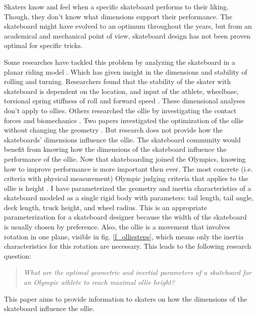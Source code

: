 Skaters know and feel when a specific skateboard performs to their liking. Though, they don’t know what dimensions support their performance. The skateboard might have evolved to an optimum throughout the years, but from an academical and mechanical point of view, skateboard design has not been proven optimal for specific tricks.

Some researches have tackled this problem by analyzing the skateboard in a planar riding model \cite{hubbard_lateral_1979,hubbard_human_1980,kremnev_nonlinear_2010,ispolov_skateboard_1996,rosatello_skateboard_2015,varszegi_stability_2017,varszegi_stabilizing_2016,varszegi_downhill_2016,varszegi_balancing_2014,kuleshov_mathematical_2007,kuleshov_various_2010}. Which has given insight in the dimensions and stability of rolling and turning. Researchers found that the stability of the skater with skateboard is dependent on the location, and input of the athlete, wheelbase, torsional spring stiffness of roll and forward speed \cite{varszegi_stability_2017,kremnev_nonlinear_2010,hubbard_lateral_1979}. These dimensional analyses don't apply to ollies. Others researched the ollie by investigating the contact forces \cite{anderson_ollie_2020,shield_contact-implicit_2022} and biomechanics \cite{frederick_biomechanics_2006,vorlicek_analysis_2015,wood_3d_2020,nakashima_simulation_2021,nevitt_ground_2006,candotti_lower_2012,dias_using_2016,anderson_ollie_2020,bridgman_human_1992,ou_postural_2021}. Two papers investigated the optimization of the ollie without changing the geometry \cite{anderson_ollie_2020,shield_contact-implicit_2022}. But research does not provide how the skateboards' dimensions influence the ollie. The skateboard community would benefit from knowing how the dimensions of the skateboard influence the performance of the ollie. 
Now that skateboarding joined the Olympics, knowing how to improve performance is more important then ever. The most concrete (i.e. criteria with physical measurement) Olympic judging criteria that applies to the ollie is height \cite{world_skate_skateboarding_2021}. I have parameterized the geometry and inertia characteristics of a skateboard modeled as a single rigid body with parameters: tail length, tail angle, deck length, truck height, and wheel radius. This is an appropriate parameterization for a skateboard designer because the width of the skateboard is usually chosen by preference. Also, the ollie is a movement that involves rotation in one plane, visible in fig. \ref{f_olliesteps}, which means only the inertia characteristics for this rotation are necessary. 
\newpage
\noindent This leads to the following research question:

\begin{quote}
\textit{
    What are the optimal geometric and inertial parameters of a skateboard for an Olympic athlete to reach maximal ollie height?}
\end{quote}

This paper aims to provide information to skaters on how the dimensions of the skateboard influence the ollie.\\ 
